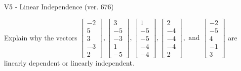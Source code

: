 \begin{exercise}
  \begin{exerciseTitle}V5 - Linear Independence (ver. 676)\end{exerciseTitle}
  \begin{exerciseStatement}
    Explain why the vectors \(\left[\begin{array}{r}
-2 \\
5 \\
3 \\
-3 \\
2
\end{array}\right] , \left[\begin{array}{r}
3 \\
-5 \\
-3 \\
1 \\
-5
\end{array}\right] , \left[\begin{array}{r}
1 \\
-5 \\
-5 \\
-4 \\
-4
\end{array}\right] , \left[\begin{array}{r}
2 \\
-4 \\
-4 \\
-4 \\
2
\end{array}\right] , \text{ and } \left[\begin{array}{r}
-2 \\
-5 \\
4 \\
-1 \\
3
\end{array}\right]\) are linearly dependent or linearly independent.	



\end{exerciseStatement}
\end{exercise}
